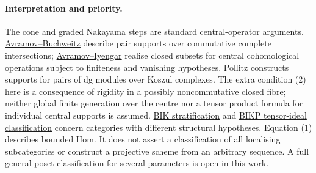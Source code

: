 \documentclass[11pt]{article}
\begin{document}
\paragraph{Interpretation and priority.}
The cone and graded Nakayama steps are standard central-operator
arguments. \href{https://doi.org/10.1007/s002220000090}{Avramov--Buchweitz}
describe pair supports over commutative complete intersections;
\href{https://arxiv.org/abs/math/0702654}{Avramov--Iyengar} realise
closed subsets for central cohomological operations subject to finiteness
and vanishing hypotheses. \href{https://arxiv.org/abs/1912.12009}{Pollitz}
constructs supports for pairs of dg modules over Koszul complexes.
The extra condition (2) here is a consequence of rigidity in a possibly
noncommutative closed fibre; neither global finite generation over the
centre nor a tensor product formula for individual central supports
is assumed. \href{https://arxiv.org/abs/0910.0642}{BIK stratification}
and \href{https://arxiv.org/abs/1510.06773}{BIKP tensor-ideal
classification} concern categories with different structural hypotheses.
Equation (1) describes bounded Hom. It does not assert a classification
of all localising subcategories or construct a projective scheme from
an arbitrary sequence. A full general poset classification for several
parameters is open in this work.
\end{document}
